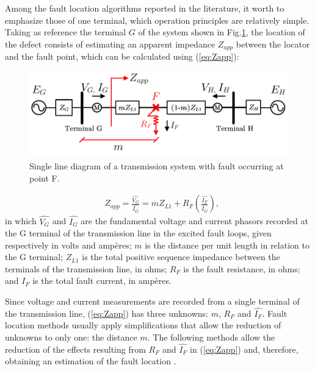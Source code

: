 \documentclass[conference]{IEEEtran}
\begin{document}
	Among the fault location algorithms reported in the literature, it worth to emphasize those of one terminal, which operation principles are relatively simple. Taking as reference the terminal $G$ of the system shown in Fig.\ref{fig:SistLocFal}, the location of the defect consists of estimating an apparent impedance $Z_{app}$ between the locator and the fault point, which can be calculated using (\ref{eq:Zapp}):
	\begin{figure}[hbt]
		\begin{center}
			\includegraphics[width=1\columnwidth]{./fig/SistLocFal.pdf}
			\caption{Single line diagram of a transmission system with fault occurring at point F.}
			\label{fig:SistLocFal}
		\end{center}
	\end{figure}
	
	\begin{equation}\label{eq:Zapp}
		\begin{aligned}
			&Z_{app}=\frac{\widehat{V_G}}{\widehat{I_G}}=mZ_{L1}+R_F\left(\frac{\widehat{I_F}}{\widehat{I_G}}\right),
		\end{aligned}
	\end{equation}
	in which $\widehat{V_G}$ and $\widehat{I_G}$ are the fundamental voltage and current phasors recorded at the G terminal of the transmission line in the excited fault loops, given respectively in volts and ampères; $m$ is the distance per unit length in relation to the G terminal; $Z_{L1}$ is the total positive sequence impedance between the terminals of the transmission line, in ohms; $R_F$ is the fault resistance, in ohms; and $I _F$ is the total fault current, in ampères.
	
	Since voltage and current measurements are recorded from a single terminal of the transmission line, (\ref{eq:Zapp}) has three unknowns: $m$, $R_F$ and $\widehat{I_F}$. Fault location methods usually apply simplifications that allow the reduction of unknowns to only one: the distance $m$. The following methods allow the reduction of the effects resulting from $R_F$ and $\widehat{I_F}$ in (\ref{eq:Zapp}) and, therefore, obtaining an estimation of the fault location \cite{Das2014}.
	
\end{document}
